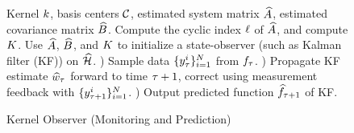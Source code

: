 \begin{figure}[t!]
	\begin{algorithm}[H]
		\caption{Kernel Observer (Monitoring and Prediction)}
		\label{alg:egp_inf}
		\begin{algorithmic}
				 Kernel $k$, basis centers $\mathcal{C}$, 
				estimated system matrix $\widehat{A}$, estimated covariance matrix $\widehat{B}$.
				 Compute the cyclic index $\ell$ of $\widehat{A}$, and compute $K$.
				 Use $\widehat{A}$, $\widehat{B}$, and $K$ to initialize a state-observer (such as Kalman filter (KF)) on $\widehat{\mathcal{H}}$.
				) Sample data $\{y^i_{\tau}\}_{i=1}^{N}$ from $f_{\tau}$.
				) Propagate KF estimate $\widehat{w}_{\tau}$ 
				forward to time $\tau+1$, correct using measurement feedback with $\{y^i_{\tau+1}\}_{i=1}^{N}$. 
				) Output predicted function $\widehat{f}_{\tau+1}$ of KF.
				\ENDWHILE   
		\end{algorithmic}
	\end{algorithm}
	\vspace{-0.2in}
\end{figure}

